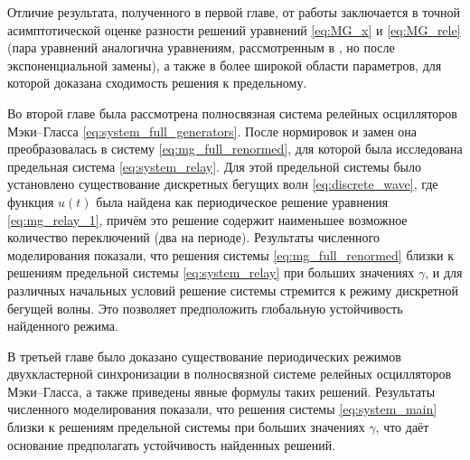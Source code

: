 Отличие результата, полученного в первой главе, от работы \cite{Bartha2021} заключается в точной асимптотической оценке разности решений уравнений \eqref{eq:MG_x} и \eqref{eq:MG_rele} (пара уравнений аналогична уравнениям, рассмотренным в \cite{Bartha2021, Krisztin2020}, но после экспоненциальной замены), а также в более широкой области параметров, для которой доказана сходимость решения к предельному.

Во второй главе была рассмотрена полносвязная система релейных осцилляторов Мэки--Гласса \eqref{eq:system_full_generators}. После нормировок и замен она преобразовалась в систему \eqref{eq:mg_full_renormed}, для которой была исследована предельная система \eqref{eq:system_relay}. Для этой предельной системы было установлено существование дискретных бегущих волн \eqref{eq:discrete_wave}, где функция $u(t)$ была найдена как периодическое решение уравнения \eqref{eq:mg_relay_1}, причём это решение содержит наименьшее возможное количество переключений (два на периоде). Результаты численного моделирования показали, что решения системы \eqref{eq:mg_full_renormed} близки к решениям предельной системы \eqref{eq:system_relay} при больших значениях $\gamma$, и для различных начальных условий решение системы стремится к режиму дискретной бегущей волны. Это позволяет предположить глобальную устойчивость найденного режима.

В третьей главе было доказано существование периодических режимов двухкластерной синхронизации в полносвязной системе релейных осцилляторов Мэки--Гласса, а также приведены явные формулы таких решений. Результаты численного моделирования показали, что решения системы \eqref{eq:system_main} близки к решениям предельной системы при больших значениях $\gamma$, что даёт основание предполагать устойчивость найденных решений.





